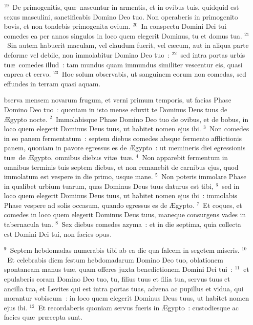 ${}^{19}$~De primogenitis, qu\ae\ nascuntur in armentis, et in ovibus tuis, quidquid est sexus masculini, sanctificabis Domino Deo tuo. Non operaberis in primogenito bovis, et non tondebis primogenita ovium.
${}^{20}$~In conspectu Domini Dei tui comedes ea per annos singulos in loco quem elegerit Dominus, tu et domus tua.
${}^{21}$~Sin autem habuerit maculam, vel claudum fuerit, vel c\ae cum, aut in aliqua parte deforme vel debile, non immolabitur Domino Deo tuo~:
${}^{22}$~sed intra portas urbis tu\ae\ comedes illud~: tam mundus quam immundus similiter vescentur eis, quasi caprea et cervo.
${}^{23}$~Hoc solum observabis, ut sanguinem eorum non comedas, sed effundes in terram quasi aquam.

\bchapter
{}bserva mensem novarum frugum, et verni primum temporis, ut facias Phase Domino Deo tuo~: quoniam in isto mense eduxit te Dominus Deus tuus de \AE gypto nocte.
${}^{2}$~Immolabisque Phase Domino Deo tuo de ovibus, et de bobus, in loco quem elegerit Dominus Deus tuus, ut habitet nomen ejus ibi.
${}^{3}$~Non comedes in eo panem fermentatum~: septem diebus comedes absque fermento afflictionis panem, quoniam in pavore egressus es de \AE gypto~: ut memineris diei egressionis tu\ae\ de \AE gypto, omnibus diebus vit\ae\ tu\ae .
${}^{4}$~Non apparebit fermentum in omnibus terminis tuis septem diebus, et non remanebit de carnibus ejus, quod immolatum est vespere in die primo, usque mane.
${}^{5}$~Non poteris immolare Phase in qualibet urbium tuarum, quas Dominus Deus tuus daturus est tibi,
${}^{6}$~sed in loco quem elegerit Dominus Deus tuus, ut habitet nomen ejus ibi~: immolabis Phase vespere ad solis occasum, quando egressus es de \AE gypto.
${}^{7}$~Et coques, et comedes in loco quem elegerit Dominus Deus tuus, maneque consurgens vades in tabernacula tua.
${}^{8}$~Sex diebus comedes azyma~: et in die septima, quia collecta est Domini Dei tui, non facies opus.


${}^{9}$~Septem hebdomadas numerabis tibi ab ea die qua falcem in segetem miseris.
${}^{10}$~Et celebrabis diem festum hebdomadarum Domino Deo tuo, oblationem spontaneam manus tu\ae , quam offeres juxta benedictionem Domini Dei tui~:
${}^{11}$~et epulaberis coram Domino Deo tuo, tu, filius tuus et filia tua, servus tuus et ancilla tua, et Levites qui est intra portas tuas, advena ac pupillus et vidua, qui morantur vobiscum~: in loco quem elegerit Dominus Deus tuus, ut habitet nomen ejus ibi.
${}^{12}$~Et recordaberis quoniam servus fueris in \AE gypto~: custodiesque ac facies qu\ae\ pr\ae cepta sunt.


